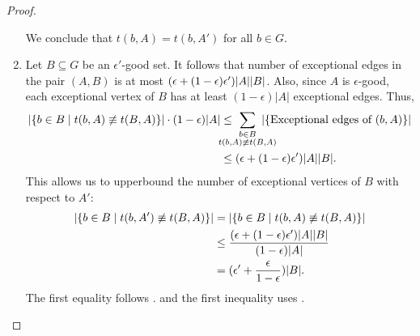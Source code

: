 \begin{lemma}
\begin{proof}
\begin{enumerate}[label=(\alph*), ref=\alph*]
                We conclude that $t(b,A) = t(b,A')$ for all $b \in G$.
                \item
                    Let $B \subseteq G$ be an $\epsilon'$-good set.
                    It follows  that number of exceptional edges
                    in the pair $(A,B)$ is at most \mbox{$( \epsilon + ( 1 - \epsilon ) \epsilon' )| A || B |$}.
                    Also, since  $A$ is $\epsilon$-good, each exceptional vertex of $B$ has at least $(1-\epsilon)|A|$ exceptional edges.
                    Thus,
                    \begin{align} \nonumber
                        \parstraight{\parcurly{b \in B \mid t(b, A) \not\equiv t(B,A)}} \cdot \parround{1 - \epsilon}\parstraight{A}
                            & \leq \hspace{-1.5em}\sum_{\substack{b \in B \\ t(b, A) \not\equiv t(B,A)}}\hspace{-1.5em}
                                \parstraight{\parcurly{\text{Exceptional edges of }(b,A)}} \\
                            & \leq \parround{\epsilon + \parround{1 - \epsilon} \epsilon'}\parstraight{A}\parstraight{B}. \label{eq:exceptions}
                    \end{align}
                    This allows us to upperbound the number of exceptional vertices of $B$ with respect to $A'$:
                    \begin{align}
                        | \{ b \in B \mid t(b, A') \not\equiv t(B,A) \} |
                            & = | \{ b \in B \mid t(b, A) \not\equiv t(B,A) \} | \nonumber \\
                            & \leq \frac{( \epsilon + ( 1 - \epsilon ) \epsilon' )| A || B |}
                                {( 1 - \epsilon )| A |} \nonumber \\
                            & = ( \epsilon' + \frac{\epsilon}{1 - \epsilon} )| B |. \label{eq:exceptional_edges_BAi}
                    \end{align}
                    The first equality follows .
                    and the first inequality uses .


\end{enumerate}
\end{proof}
\end{lemma}
